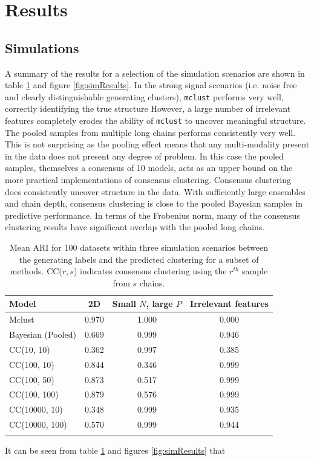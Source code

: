 \documentclass{bioinfo}
\begin{document}
\section{Results}
\subsection{Simulations}
A summary of the results for a selection of the simulation scenarios are shown in table \ref{table:meanARISims} and figure \ref{fig:simResults}. In the strong signal scenarios (i.e. noise free and clearly distinguishable generating clusters), \texttt{mclust} performs very well, correctly identifying the true structure However, a large number of irrelevant features completely erodes the ability of \texttt{mclust} to uncover meaningful structure. The pooled samples from multiple long chains performs consistently very well. This is not surprising as the pooling effect means that any multi-modality present in the data does not present any degree of problem. In this case the pooled samples, themselves a consensus of 10 models, acts as an upper bound on the more practical implementations of consensus clustering. Consensus clustering does consistently uncover structure in the data. With sufficiently large ensembles and chain depth, consensus clustering is close to the pooled Bayesian samples in predictive performance. In terms of the Frobenius norm, many of the consensus clustering results have significant overlap with the pooled long chains.

\begin{table}[ht]
	\centering
	\caption{Mean ARI for 100 datasets within three simulation scenarios between the generating labels and the predicted clustering for a subset of methods. CC($r, s$) indicates consensus clustering using the $r^{th}$ sample from $s$ chains.}
	\begin{tabular}{l|ccc}
		\toprule
		\textbf{Model} & 2D & Small $N$, large $P$ & Irrelevant features \\
		\midrule
		Mclust & 0.970 &       1.000 &         0.000\\
		Bayesian (Pooled) &  0.669 & 				0.999 &         0.946\\
		CC(10, 10) & 0.362 &	            0.997 &         0.385\\
		CC(100, 10) & 0.844 &			    0.346 &         0.999\\
		CC(100, 50) & 0.873 &			    0.517 &         0.999\\
		CC(100, 100) & 0.879 &  			0.576 &         0.999\\
		CC(10000, 10) & 0.348 &             0.999 &			0.935\\
		CC(10000, 100) & 0.570 &            0.999 &			0.944\\
		\botrule
	\end{tabular}
	\label{table:meanARISims}
\end{table}
It can be seen from table \ref{table:meanARISims} and figures \ref{fig:simResults} that 
\end{document}
